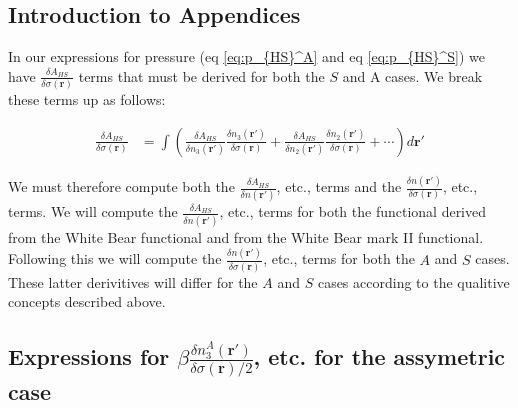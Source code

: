 \documentclass[letterpaper,twocolumn,amsmath,amssymb,jcp,10pt,aip]{revtex4-1}
\begin{document}


\begin{widetext}

\section*{Introduction to Appendices}

In our expressions for pressure (eq \ref{eq:p_{HS}^A} and eq
\ref{eq:p_{HS}^S}) we have $\frac{\delta A_{HS}}{\delta
  \sigma(\mathbf{r})}$ terms that must be derived for both the $S$ and A
cases.  We break these terms up as follows:

  \begin{align}
    \frac{\delta A_{HS}}{\delta \sigma(\mathbf{r})} &=
    \int \left(
    \frac{\delta A_{HS}}{\delta n_3(\mathbf{r}')}
    \frac{\delta n_3(\mathbf{r}')}{\delta \sigma(\mathbf{r})}
    +
    \frac{\delta A_{HS}}{\delta n_2(\mathbf{r}')}
    \frac{\delta n_2(\mathbf{r}')}{\delta \sigma(\mathbf{r})}
    + \cdots
    \right) d\mathbf{r}'
  \end{align}


We must therefore compute both the $\frac{\delta A_{HS}}{\delta
  n(\mathbf{r}')}$, etc., terms and the $\frac{\delta
  n(\mathbf{r}')}{\delta \sigma(\mathbf{r})}$, etc., terms.  We will
compute the $\frac{\delta A_{HS}}{\delta n(\mathbf{r}')}$, etc., terms
for both the functional derived from the White Bear
functional\cite{roth2002whitebear} and from the White Bear mark
II functional\cite{hansen2006density}.  Following this we will compute
the $\frac{\delta n(\mathbf{r}')}{\delta \sigma(\mathbf{r})}$, etc.,
terms for both the $A$ and $S$ cases.  These latter derivitives will
differ for the $A$ and $S$ cases according to the qualitive concepts
described above.


\subsection{Expressions for $\beta\frac{\delta n_3^{A}(\mathbf{r}')}{\delta \sigma(\mathbf{r})/2}$, etc. for the assymetric case}\label{appendix:g-A}


\end{widetext}
\end{document}
